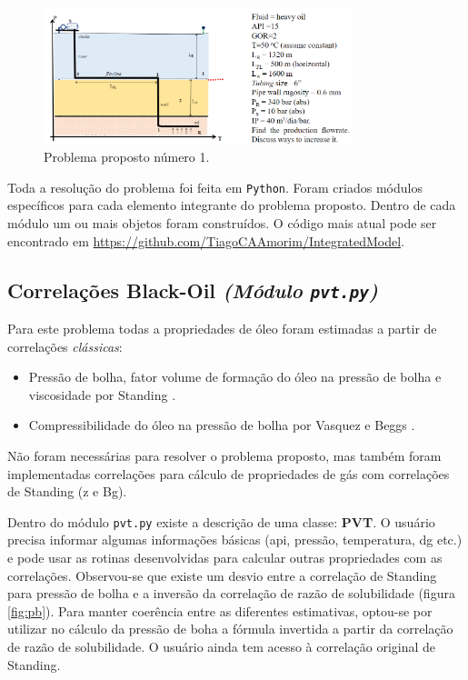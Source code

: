\documentclass[final,3p]{elsarticle}
\numberwithin{equation}{section}
\begin{document}
        \begin{figure}
            \centering
            \includegraphics[width=0.8\textwidth]{Problem_01.png}
            \caption{Problema proposto número 1.}
            \label{fig:problema_proposto}
        \end{figure}

        Toda a resolução do problema foi feita em \texttt{Python}. Foram criados módulos específicos para cada elemento integrante do problema proposto. Dentro de cada módulo um ou mais objetos foram construídos. O código mais atual pode ser encontrado em \href{https://github.com/TiagoCAAmorim/IntegratedModel/tree/main/sample}{https://github.com/TiagoCAAmorim/IntegratedModel}.

    \subsection{Correlações Black-Oil \emph{(Módulo \texttt{pvt.py})}}

        Para este problema todas a propriedades de óleo foram estimadas a partir de correlações \emph{clássicas}:

        \begin{itemize}
            \item Pressão de bolha, fator volume de formação do óleo na pressão de bolha e viscosidade por Standing \cite{standing1952volumetric}.
            \item Compressibilidade do óleo na pressão de bolha por Vasquez e Beggs \cite{VasquezBeggs}.
        \end{itemize}

        Não foram necessárias para resolver o problema proposto, mas também foram implementadas correlações para cálculo de propriedades de gás com correlações de Standing (z e Bg).

        Dentro do módulo \texttt{pvt.py} existe a descrição de uma classe: \textbf{PVT}. O usuário precisa informar algumas informações básicas (api, pressão, temperatura, dg etc.) e pode usar as rotinas desenvolvidas para calcular outras propriedades com as correlações. Observou-se que existe um desvio entre a correlação de Standing para pressão de bolha e a inversão da correlação de razão de solubilidade (figura \ref{fig:pb}). Para manter coerência entre as diferentes estimativas, optou-se por utilizar no cálculo da pressão de boha a fórmula invertida a partir da correlação de razão de solubilidade. O usuário ainda tem acesso à correlação original de Standing.
\end{document}
